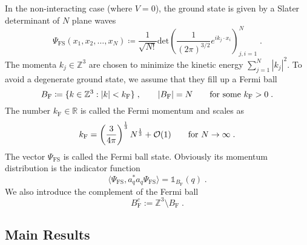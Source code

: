 \documentclass[12pt,a4paper]{article}
\numberwithin{equation}{section}
\newcommand{\ZZZ}{\mathbb{Z}}
\newcommand{\Zbb}{\mathbb{Z}}
\newcommand{\1}{\mathbb{I}}
\newcommand{\F}{\mathrm{F}}
\newcommand{\FS}{\mathrm{FS}}
\newcommand{\Rbb}{\mathbb{R}}
\DeclareMathOperator{\Z}{\mathbb{Z}}
\theoremstyle{plain}
\theoremstyle{definition}
\theoremstyle{remark}
\theoremstyle{plain}
\theoremstyle{definition}
\theoremstyle{remark}
\begin{document}
In the non-interacting case (where $ V=0 $), the ground state is given by a Slater determinant of $ N $ plane waves
\begin{equation}
	\Psi_{\FS}(x_1, x_2, \ldots, x_N) \coloneq \frac{1}{\sqrt{N!}}\text{det}\left(\frac{1}{(2\pi)^{3/2}}e^{ik_j\cdot x_i}\right)^N_{j,i=1} \;.
\end{equation}
The momenta $ k_j \in \Zbb^3$ are chosen to minimize the kinetic energy $ \sum_{j=1}^N |k_j|^2 $. To avoid a degenerate ground state, we assume that they fill up a Fermi ball
\begin{equation}
	B_{\F} \coloneq \{ k \in \ZZZ^3 : |k| < k_{\F} \} \;, \qquad
	|B_{\F}| = N \qquad \textnormal{for some } k_{\F} > 0 \;.
\end{equation}
The number $ k_{\F} \in \Rbb$ is called the Fermi momentum and scales as
\begin{equation}
	k_{\F} = \left(\frac{3}{4\pi}\right)^\frac{1}{3}N^\frac{1}{3} + \mathcal{O}(1) \qquad \textnormal{for } N\to \infty \;.
 \end{equation}
The vector  $ \Psi_{\FS} $ is called the Fermi ball state. Obviously its momentum distribution is the indicator function
\begin{equation}
	\langle \Psi_{\FS}, a_q^* a_q \Psi_{\FS} \rangle
	= \mathds{1}_{B_{\F}}(q) \;.
\end{equation}
We also introduce the complement of the Fermi ball
\begin{equation}
   B_\text{F}^c := \Zbb^3 \setminus B_\text{F} \;.
\end{equation}


\subsection{Main Results}
\label{subsec:mainresult}
\end{document}
